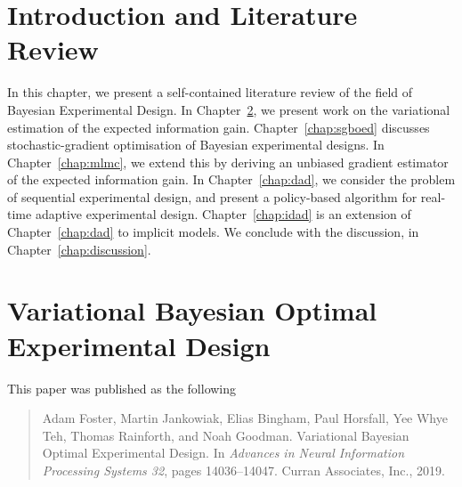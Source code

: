 \documentclass[a4paper, 10pt]{report}
\theoremstyle{plain}
\theoremstyle{definition}
\theoremstyle{remark}
\begin{document}
	
	\tableofcontents
	
	
\newpage
	
	
	\chapter{Introduction and Literature Review}
	\label{chap:intro}
	In this chapter, we present a self-contained literature review of the field of Bayesian Experimental Design.
	In Chapter~\ref{chap:vboed}, we present work on the variational estimation of the expected information gain.
	Chapter~\ref{chap:sgboed} discusses stochastic-gradient optimisation of Bayesian experimental designs.
	In Chapter~\ref{chap:mlmc}, we extend this by deriving an unbiased gradient estimator of the expected information gain.
	In Chapter~\ref{chap:dad}, we consider the problem of sequential experimental design, and present a policy-based algorithm for real-time adaptive experimental design.
	Chapter~\ref{chap:idad} is an extension of Chapter~\ref{chap:dad} to implicit models.
	We conclude with the discussion, in Chapter~\ref{chap:discussion}. 
	
	
	\chapter{Variational Bayesian Optimal Experimental Design}
	\label{chap:vboed}
	This paper was published as the following
	\begin{quote}
		Adam Foster, Martin Jankowiak, Elias Bingham, Paul Horsfall, Yee Whye Teh, Thomas Rainforth, and Noah Goodman. Variational Bayesian Optimal Experimental Design.  In \emph{Advances in Neural Information Processing Systems 32}, pages 14036–14047. Curran Associates, Inc., 2019.
	\end{quote}
	
\end{document}

